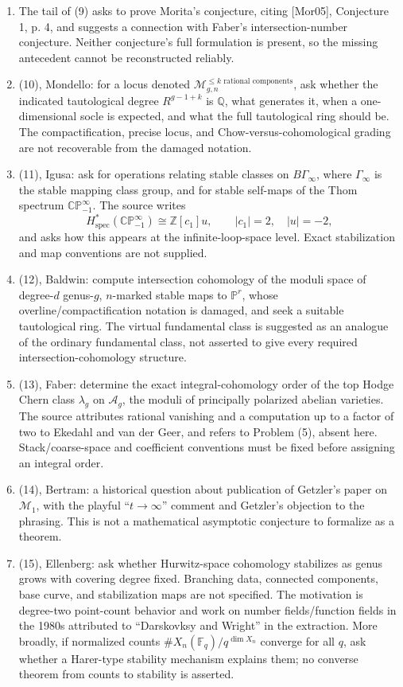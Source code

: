 \documentclass[11pt]{article}
\newcommand{\Z}{\mathbb{Z}}
\newcommand{\Q}{\mathbb{Q}}
\newcommand{\F}{\mathbb{F}}
\newcommand{\PP}{\mathbb{P}}
\begin{document}
\begin{enumerate}
\item The tail of (9) asks to prove Morita's conjecture, citing [Mor05], Conjecture 1, p. 4, and suggests a connection with Faber's intersection-number conjecture. Neither conjecture's full formulation is present, so the missing antecedent cannot be reconstructed reliably.
\item (10), Mondello: for a locus denoted \(\mathcal M_{g,n}^{\leq k\text{ rational components}}\), ask whether the indicated tautological degree \(R^{g-1+k}\) is \(\Q\), what generates it, when a one-dimensional socle is expected, and what the full tautological ring should be. The compactification, precise locus, and Chow-versus-cohomological grading are not recoverable from the damaged notation.
\item (11), Igusa: ask for operations relating stable classes on \(B\Gamma_\infty\), where \(\Gamma_\infty\) is the stable mapping class group, and for stable self-maps of the Thom spectrum \(\mathbb{CP}^{\infty}_{-1}\). The source writes
\[
H^*_{\mathrm{spec}}(\mathbb{CP}^{\infty}_{-1})\cong\Z[c_1]u,
\qquad |c_1|=2,\quad |u|=-2,
\]
and asks how this appears at the infinite-loop-space level. Exact stabilization and map conventions are not supplied.
\item (12), Baldwin: compute intersection cohomology of the moduli space of degree-\(d\) genus-\(g\), \(n\)-marked stable maps to \(\PP^r\), whose overline/compactification notation is damaged, and seek a suitable tautological ring. The virtual fundamental class is suggested as an analogue of the ordinary fundamental class, not asserted to give every required intersection-cohomology structure.
\item (13), Faber: determine the exact integral-cohomology order of the top Hodge Chern class \(\lambda_g\) on \(\mathcal A_g\), the moduli of principally polarized abelian varieties. The source attributes rational vanishing and a computation up to a factor of two to Ekedahl and van der Geer, and refers to Problem (5), absent here. Stack/coarse-space and coefficient conventions must be fixed before assigning an integral order.
\item (14), Bertram: a historical question about publication of Getzler's paper on \(\mathcal M_1\), with the playful ``\(t\to\infty\)'' comment and Getzler's objection to the phrasing. This is not a mathematical asymptotic conjecture to formalize as a theorem.
\item (15), Ellenberg: ask whether Hurwitz-space cohomology stabilizes as genus grows with covering degree fixed. Branching data, connected components, base curve, and stabilization maps are not specified. The motivation is degree-two point-count behavior and work on number fields/function fields in the 1980s attributed to ``Darskovksy and Wright'' in the extraction. More broadly, if normalized counts \(\#X_n(\F_q)/q^{\dim X_n}\) converge for all \(q\), ask whether a Harer-type stability mechanism explains them; no converse theorem from counts to stability is asserted.

\end{enumerate}
\end{document}
